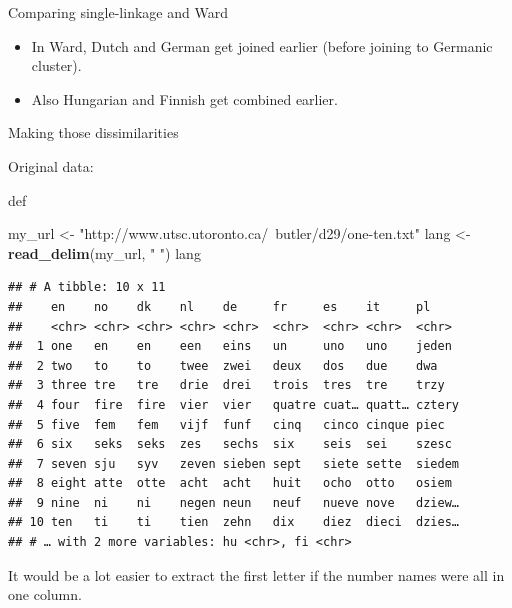 \documentclass[ignorenonframetext,]{beamer}
\newenvironment{Shaded}{\begin{snugshade}}{\end{snugshade}}
\newcommand{\KeywordTok}[1]{\textcolor[rgb]{0.13,0.29,0.53}{\textbf{#1}}}
\newcommand{\NormalTok}[1]{#1}
\newcommand{\StringTok}[1]{\textcolor[rgb]{0.31,0.60,0.02}{#1}}
\begin{document}
\begin{frame}{Comparing single-linkage and Ward}
\protect\hypertarget{comparing-single-linkage-and-ward}{}

\begin{itemize}
\item
  In Ward, Dutch and German get joined earlier (before joining to
  Germanic cluster).
\item
  Also Hungarian and Finnish get combined earlier.
\end{itemize}

\end{frame}

\begin{frame}[fragile]{Making those dissimilarities}
\protect\hypertarget{making-those-dissimilarities}{}

Original data:

def

\begin{Shaded}
\begin{Highlighting}[]
\NormalTok{my_url <-}\StringTok{ "http://www.utsc.utoronto.ca/~butler/d29/one-ten.txt"}
\NormalTok{lang <-}\StringTok{ }\KeywordTok{read_delim}\NormalTok{(my_url, }\StringTok{" "}\NormalTok{)}
\NormalTok{lang}
\end{Highlighting}
\end{Shaded}

\begin{verbatim}
## # A tibble: 10 x 11
##    en    no    dk    nl    de     fr     es    it     pl    
##    <chr> <chr> <chr> <chr> <chr>  <chr>  <chr> <chr>  <chr> 
##  1 one   en    en    een   eins   un     uno   uno    jeden 
##  2 two   to    to    twee  zwei   deux   dos   due    dwa   
##  3 three tre   tre   drie  drei   trois  tres  tre    trzy  
##  4 four  fire  fire  vier  vier   quatre cuat… quatt… cztery
##  5 five  fem   fem   vijf  funf   cinq   cinco cinque piec  
##  6 six   seks  seks  zes   sechs  six    seis  sei    szesc 
##  7 seven sju   syv   zeven sieben sept   siete sette  siedem
##  8 eight atte  otte  acht  acht   huit   ocho  otto   osiem 
##  9 nine  ni    ni    negen neun   neuf   nueve nove   dziew…
## 10 ten   ti    ti    tien  zehn   dix    diez  dieci  dzies…
## # … with 2 more variables: hu <chr>, fi <chr>
\end{verbatim}

It would be a lot easier to extract the first letter if the number names
were all in one column.

\end{frame}
\end{document}
